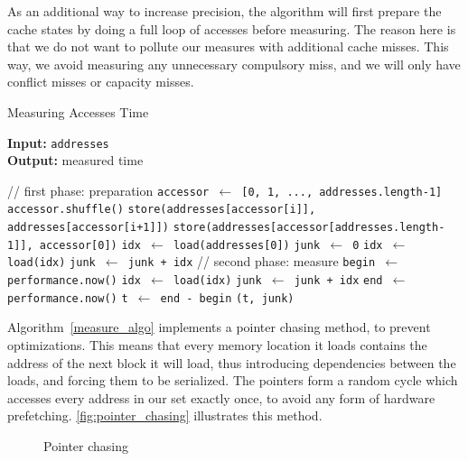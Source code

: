 \documentclass[a4paper,11pt,oneside]{report}
\begin{document}
As an additional way to increase precision, the algorithm will first prepare the cache states by doing a full loop of accesses before measuring. The reason here is that we do not want to pollute our measures with additional cache misses. This way, we avoid measuring any unnecessary compulsory miss, and we will only have conflict misses or capacity misses.

\begin{algorithm}
\caption{Measuring Accesses Time}\label{measure_algo}
\hspace*{\algorithmicindent} \textbf{Input:} \texttt{addresses}\\
\hspace*{\algorithmicindent} \textbf{Output:} measured time
\begin{algorithmic}[1]
\State \textcolor{CommentGray}{// first phase: preparation}
\State \texttt{accessor $\gets$ [0, 1, ..., addresses.length-1]}
\State \texttt{accessor.shuffle()}
\State \texttt{store(addresses[accessor[i]], addresses[accessor[i+1]])}
\EndFor
\State \texttt{store(addresses[accessor[addresses.length-1]], accessor[0])}
\State \texttt{idx $\gets$ load(addresses[0])} 
\State \texttt{junk $\gets$ 0}
\State \texttt{idx $\gets$ load(idx)}
\State \texttt{junk $\gets$ junk + idx}
\EndFor
\State
\State \textcolor{CommentGray}{// second phase: measure}
\State \texttt{begin $\gets$ performance.now()}
\State \texttt{idx $\gets$ load(idx)}
\State \texttt{junk $\gets$ junk + idx}
\EndFor
\State \texttt{end $\gets$ performance.now()}
\State \texttt{t $\gets$ end - begin}
\State \Return \texttt{(t, junk)}
\EndProcedure
\end{algorithmic}
\end{algorithm}

Algorithm~\ref{measure_algo} implements a pointer chasing method, to prevent optimizations. This means that every memory location it loads contains the address of the next block it will load, thus introducing dependencies between the loads, and forcing them to be serialized. The pointers form a random cycle which accesses every address in our set exactly once, to avoid any form of hardware prefetching. \autoref{fig:pointer_chasing} illustrates this method.

\begin{figure}
    \centering
    \caption{Pointer chasing}
    \label{fig:pointer_chasing}
\end{figure}
\end{document}
